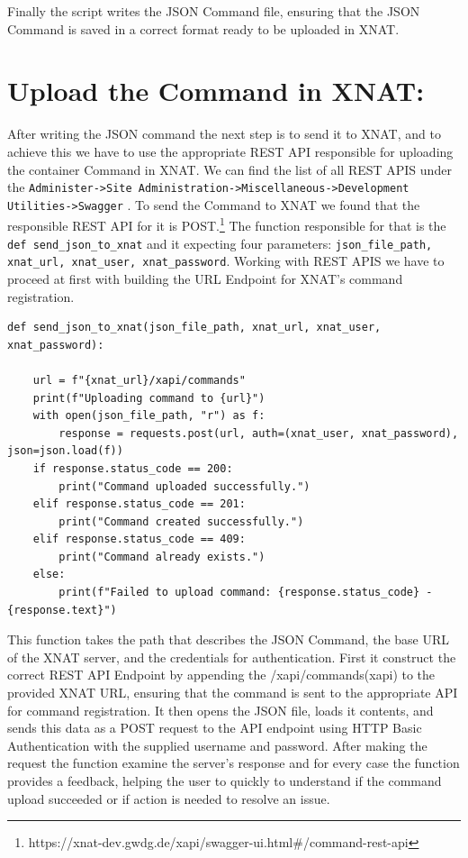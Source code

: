  Finally the script writes the JSON Command file, ensuring that the JSON Command is saved in a correct format ready to be uploaded in XNAT.
 
 \section{Upload the Command in XNAT:}

 After writing the JSON command the next step is to send it to XNAT, and to achieve this we have to use the appropriate REST API responsible for uploading the container Command in XNAT.
 We can find the list of all REST APIS under the \texttt{Administer->Site Administration->Miscellaneous->Development Utilities->Swagger} .
 To send the Command to XNAT we found that the responsible REST API for it is POST.\footnote{https://xnat-dev.gwdg.de/xapi/swagger-ui.html\#/command-rest-api}
 The function responsible for that is the \texttt{def send\_json\_to\_xnat} and it expecting four parameters: \texttt{json\_file\_path, xnat\_url, xnat\_user, xnat\_password}. Working with REST APIS we have to proceed at first with building the URL Endpoint for XNAT’s command registration.
 
\begin{lstlisting}
def send_json_to_xnat(json_file_path, xnat_url, xnat_user, xnat_password): 

    url = f"{xnat_url}/xapi/commands"
    print(f"Uploading command to {url}")
    with open(json_file_path, "r") as f:
        response = requests.post(url, auth=(xnat_user, xnat_password), json=json.load(f))
    if response.status_code == 200:
        print("Command uploaded successfully.")
    elif response.status_code == 201:
        print("Command created successfully.")
    elif response.status_code == 409:
        print("Command already exists.")
    else:
        print(f"Failed to upload command: {response.status_code} - {response.text}")

\end{lstlisting}

This function takes the path that describes the JSON Command, the base URL of the XNAT server, and the credentials for authentication. First it construct the correct REST API Endpoint by appending the /xapi/commands(xapi) to the provided XNAT URL, ensuring that the command is sent to the appropriate API for command registration. It then opens the JSON file, loads it contents, and sends this data as a POST request to the API endpoint using HTTP Basic Authentication with the supplied username and password. After making the request the function examine the server's response and for every case the function provides a feedback, helping the user to quickly to understand if the command upload succeeded or if action is needed to resolve an issue. 

